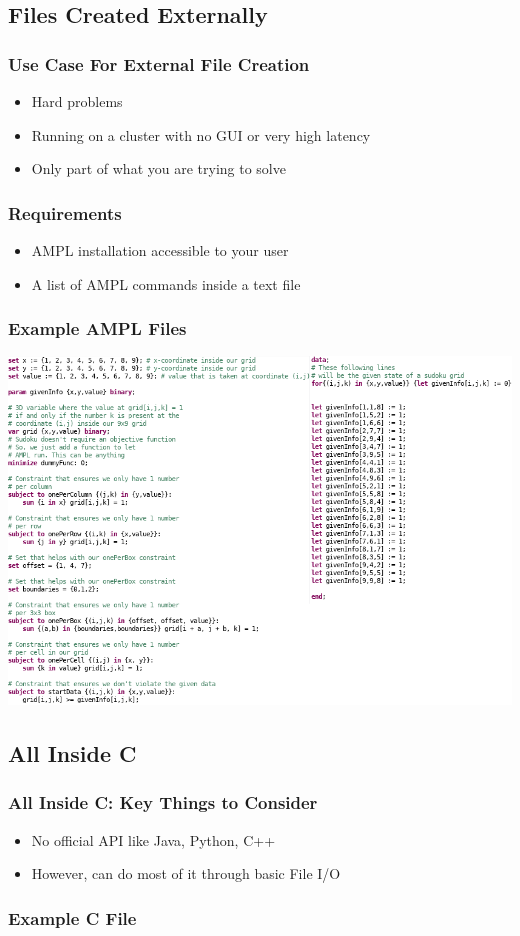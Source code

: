 \documentclass{beamer}
\begin{document}
    \subsection{Files Created Externally}
    \begin{frame}
        \frametitle{Use Case For External File Creation}
        \begin{itemize}
            \item Hard problems
            \item Running on a cluster with no GUI or very high latency
            \item Only part of what you are trying to solve
        \end{itemize}
    \end{frame}
    \begin{frame}
        \frametitle{Requirements}
        \begin{itemize}
            \item AMPL installation accessible to your user
            \item A list of AMPL commands inside a text file
        \end{itemize}
    \end{frame}
    \begin{frame}
        \frametitle{Example AMPL Files}
        \includegraphics[width=\textwidth]{figures/presentationFile.png}
   \end{frame}
    \subsection{All Inside C}
    \begin{frame}
        \frametitle{All Inside C: Key Things to Consider}
        \begin{itemize}
            \item No official API like Java, Python, C++
            \item However, can do most of it through basic File I/O
        \end{itemize}
    \end{frame}
    \begin{frame}
        \frametitle{Example C File}
    \end{frame}
\end{document}
